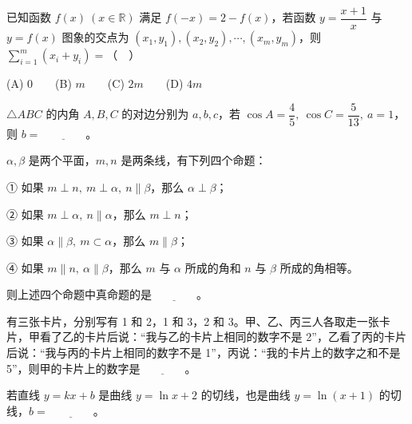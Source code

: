 \begin{question}
已知函数 \(f(x)\ (x\in\mathbb R)\) 满足 \(f(-x)=2-f(x)\)，若函数 \(y=\dfrac{x+1}{x}\) 与 \(y=f(x)\) 图象的交点为 \((x_1,y_1),(x_2,y_2),\cdots,(x_m,y_m)\)，则 \(\displaystyle\sum_{i=1}^m(x_i+y_i)=\)（　）

   (A) 0　　(B) \(m\)　　(C) \(2m\)　　(D) \(4m\)

\end{question}

\begin{question}
\(\triangle ABC\) 的内角 \(A,B,C\) 的对边分别为 \(a,b,c\)，若 \(\cos A=\dfrac45,\ \cos C=\dfrac5{13},\ a=1\)，则 \(b=\underline{\qquad\qquad}\)。

\end{question}
\begin{question}
\(\alpha,\beta\) 是两个平面，\(m,n\) 是两条线，有下列四个命题：

   ① 如果 \(m\perp n,\ m\perp\alpha,\ n\parallel\beta\)，那么 \(\alpha\perp\beta\)；

   ② 如果 \(m\perp\alpha,\ n\parallel\alpha\)，那么 \(m\perp n\)；

   ③ 如果 \(\alpha\parallel\beta,\ m\subset\alpha\)，那么 \(m\parallel\beta\)；

   ④ 如果 \(m\parallel n,\ \alpha\parallel\beta\)，那么 \(m\) 与 \(\alpha\) 所成的角和 \(n\) 与 \(\beta\) 所成的角相等。

   则上述四个命题中真命题的是\(\underline{\qquad\qquad}\)。

\end{question}
\begin{question}
有三张卡片，分别写有 1 和 2，1 和 3，2 和 3。甲、乙、丙三人各取走一张卡片，甲看了乙的卡片后说：“我与乙的卡片上相同的数字不是 2”，乙看了丙的卡片后说：“我与丙的卡片上相同的数字不是 1”，丙说：“我的卡片上的数字之和不是 5”，则甲的卡片上的数字是\(\underline{\qquad\qquad}\)。

\end{question}
\begin{question}
若直线 \(y=kx+b\) 是曲线 \(y=\ln x+2\) 的切线，也是曲线 \(y=\ln(x+1)\) 的切线，\(b=\underline{\qquad\qquad}\)。

\end{question}

